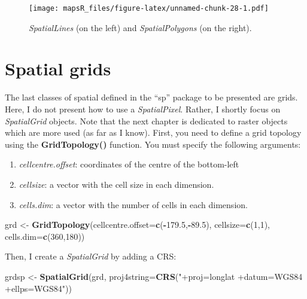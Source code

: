 \documentclass[]{report}
\newenvironment{Shaded}{\begin{snugshade}}{\end{snugshade}}
\newcommand{\DataTypeTok}[1]{\textcolor[rgb]{0.13,0.29,0.53}{#1}}
\newcommand{\DecValTok}[1]{\textcolor[rgb]{0.00,0.00,0.81}{#1}}
\newcommand{\FloatTok}[1]{\textcolor[rgb]{0.00,0.00,0.81}{#1}}
\newcommand{\KeywordTok}[1]{\textcolor[rgb]{0.13,0.29,0.53}{\textbf{#1}}}
\newcommand{\NormalTok}[1]{#1}
\newcommand{\OperatorTok}[1]{\textcolor[rgb]{0.81,0.36,0.00}{\textbf{#1}}}
\newcommand{\StringTok}[1]{\textcolor[rgb]{0.31,0.60,0.02}{#1}}
\providecommand{\tightlist}{%
  \setlength{\itemsep}{0pt}\setlength{\parskip}{0pt}}
\begin{document}
\begin{figure}
\centering
\texttt{[image: mapsR\_files/figure-latex/unnamed-chunk-28-1.pdf]}
\caption{\emph{SpatialLines} (on the left) and \emph{SpatialPolygons}
(on the right).}
\end{figure}

\hypertarget{spatial-grids}{%
\chapter{Spatial grids}\label{spatial-grids}}

The last classes of spatial defined in the ``sp'' package to be
presented are grids. Here, I do not present how to use a
\emph{SpatialPixel}. Rather, I shortly focus on \emph{SpatialGrid}
objects. Note that the next chapter is dedicated to raster objects which
are more used (as far as I know). First, you need to define a grid
topology using the \textbf{GridTopology()} function. You must specify
the following arguments:

\begin{enumerate}
\def\labelenumi{\arabic{enumi}.}
\tightlist
\item
  \emph{cellcentre.offset}: coordinates of the centre of the bottom-left
\item
  \emph{cellsize}: a vector with the cell size in each dimension.
\item
  \emph{cells.dim}: a vector with the number of cells in each dimension.
\end{enumerate}

\begin{Shaded}
\begin{Highlighting}[]
\NormalTok{grd <-}\StringTok{ }\KeywordTok{GridTopology}\NormalTok{(}\DataTypeTok{cellcentre.offset=}\KeywordTok{c}\NormalTok{(}\OperatorTok{-}\FloatTok{179.5}\NormalTok{,}\OperatorTok{-}\FloatTok{89.5}\NormalTok{), }\DataTypeTok{cellsize=}\KeywordTok{c}\NormalTok{(}\DecValTok{1}\NormalTok{,}\DecValTok{1}\NormalTok{), }\DataTypeTok{cells.dim=}\KeywordTok{c}\NormalTok{(}\DecValTok{360}\NormalTok{,}\DecValTok{180}\NormalTok{))}
\end{Highlighting}
\end{Shaded}

Then, I create a \emph{SpatialGrid} by adding a CRS:

\begin{Shaded}
\begin{Highlighting}[]
\NormalTok{grdsp <-}\StringTok{ }\KeywordTok{SpatialGrid}\NormalTok{(grd, }\DataTypeTok{proj4string=}\KeywordTok{CRS}\NormalTok{(}\StringTok{"+proj=longlat +datum=WGS84 +ellps=WGS84"}\NormalTok{))}
\end{Highlighting}
\end{Shaded}
\end{document}
